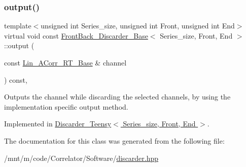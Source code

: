 \subsubsection{\texorpdfstring{output()}{output()}}
{\footnotesize\ttfamily template$<$unsigned int Series\+\_\+size, unsigned int Front, unsigned int End$>$ \\
virtual void const \hyperlink{classFrontBack__Discarder__Base}{Front\+Back\+\_\+\+Discarder\+\_\+\+Base}$<$ Series\+\_\+size, Front, End $>$\+::output (\begin{DoxyParamCaption}\item[{const \hyperlink{classLin__ACorr__RT__Base}{Lin\+\_\+\+A\+Corr\+\_\+\+R\+T\+\_\+\+Base} \&}]{channel }\end{DoxyParamCaption}) const\hspace{0.3cm}{\ttfamily [inline]}, {}}



Outputs the channel while discarding the selected channels, by using the implementation specific output method. 



Implemented in \hyperlink{classDiscarder__Teensy_a4edb6d02ac299d4c578a4c8522f0dffd}{Discarder\+\_\+\+Teensy$<$ Series\+\_\+size, Front, End $>$}.



The documentation for this class was generated from the following file\+:\begin{DoxyCompactItemize}
\item 
/mnt/m/code/\+Correlator/\+Software/\hyperlink{discarder_8hpp}{discarder.\+hpp}\end{DoxyCompactItemize}
